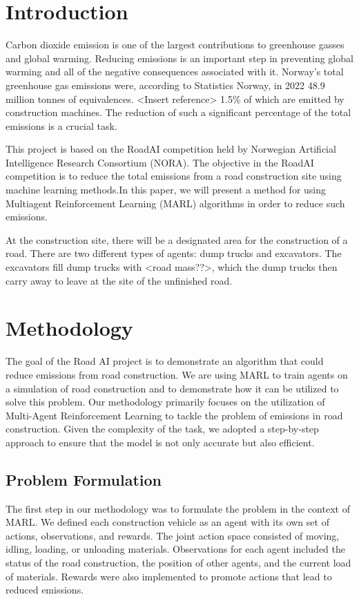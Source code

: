\documentclass[conference]{IEEEtran}
\begin{document}
\section{Introduction}
Carbon dioxide \coo emission is one of the largest contributions to greenhouse gasses and global warming.
Reducing \coo emissions is an important step in preventing global warming and all of the negative
consequences associated with it. Norway's total greenhouse gas emissions were, according to Statistics
Norway, in 2022 48.9 million tonnes of \coo equivalences. <Insert reference> 1.5\% of which are emitted
by construction machines. \cite{noraRoadAIReducing} The reduction of such a significant percentage of
the total emissions is a crucial task.

This project is based on the RoadAI competition held by Norwegian Artificial Intelligence Research
Consortium (NORA). \cite{noraRoadAIReducing} The objective in the RoadAI competition is to reduce the
total \coo emissions from a road construction site using machine learning methods.In this paper, we will
present a method for using Multiagent Reinforcement Learning (MARL) algorithms in order to reduce such
emissions.

At the construction site, there will be a designated area for the construction of a road. There are two
different types of agents: dump trucks and excavators. The excavators fill dump trucks with <road mass??>,
which the dump trucks then carry away to leave at the site of the unfinished road.



	\section{Methodology}

	The goal of the Road AI project is to demonstrate an algorithm that could reduce emissions from road construction.
	We are using MARL to train agents on a simulation of road construction and to demonstrate how it can be utilized to solve this problem.
	Our methodology primarily focuses on the utilization of Multi-Agent Reinforcement Learning to tackle the problem of emissions in road construction. Given the complexity of the task, we adopted a step-by-step approach to ensure that the model is not only accurate but also efficient.

	\subsection{Problem Formulation}
	The first step in our methodology was to formulate the problem in the context of MARL. We defined each construction vehicle as an agent with its own set of actions, observations, and rewards. The joint action space consisted of moving, idling, loading, or unloading materials. Observations for each agent included the status of the road construction, the position of other agents, and the current load of materials. Rewards were also implemented to promote actions that lead to reduced emissions.
\end{document}

